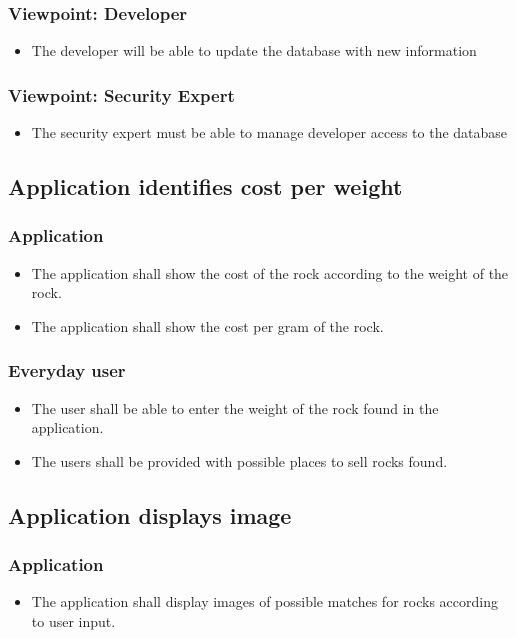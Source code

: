 \documentclass[titlepage]{article}
\begin{document}
	\subsubsection {Viewpoint: Developer}
		\begin{itemize}
			\item The developer will be able to update the database with new information
		\end{itemize}
	\subsubsection {Viewpoint: Security Expert}
		\begin{itemize}
			\item The security expert must be able to manage developer access to the database
		\end{itemize}

\subsection{Application identifies cost per weight }
\subsubsection{Application}
\begin{itemize}

  \item The application shall show the cost of the rock according to the weight of the rock. 
  \item The application shall show the cost per gram of the rock.
  \end{itemize}
  \subsubsection{Everyday user}
  \begin{itemize}
  \item The user shall be able to enter the weight of the rock found in the application.
  \item The users shall be provided with possible places to sell rocks found.
  
\end{itemize}

\subsection{Application displays image}
\subsubsection{Application}
\begin{itemize}
\item The application shall display images of possible matches for rocks according to user input.
\end{itemize}
\end{document}

